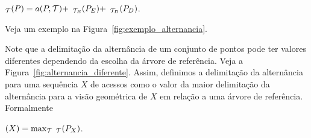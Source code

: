 \begin{center}
\Alt$_{\mathcal{T}}(P) = a(P,\mathcal{T}) +$ \Alt$_{\mathcal{T}_E}(P_E) + $ \Alt$_{\mathcal{T}_D}(P_D)$.
\end{center}

Veja um exemplo na Figura~\ref{fig:exemplo_alternancia}.

Note que a delimitação da alternância de um conjunto de pontos pode ter valores diferentes dependendo da escolha da árvore de referência. Veja a Figura~\ref{fig:alternancia_diferente}. Assim, definimos a delimitação da alternância para uma sequência $X$ de acessos como o valor da maior delimitação da alternância para a visão geométrica de $X$ em relação a uma árvore de referência. Formalmente
\begin{center}
\Alt$(X) = \max_{\mathcal{T}}$ \Alt$_{\mathcal{T}}(P_X)$.
\end{center}
\begin{figure}
    \begin{minipage}[c]{0.3\textwidth} %
\end{minipage}
\end{figure}
